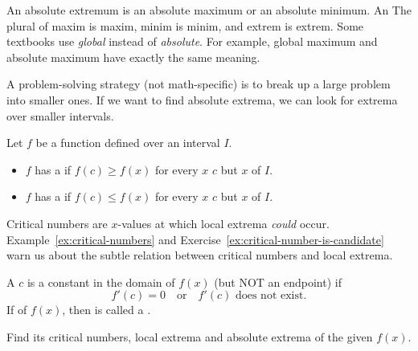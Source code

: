 \documentclass[../main.tex]{subfiles}
\begin{document}
An absolute extremum is an absolute maximum or an absolute minimum. An The plural of maxim is maxim, minim is minim, and extrem is extrem.  Some textbooks use \emph{global} instead of \emph{absolute}. For example, global maximum and absolute maximum have exactly the same meaning.

\clearpage


A problem-solving strategy (not math-specific) is to break up a large problem into smaller ones.  If we want to find absolute extrema, we can look for extrema over smaller intervals.

\begin{mdframed}[style=withref-compact]
  Let \(f\) be a function defined over an interval \(I\).

  \begin{itemize}[noitemsep]
    \item \(f\) has a  if \(f(c) \ge f(x)\) for every \(x\)  \(c\) but \(x\)  of \(I\).
    \item \(f\) has a  if \(f(c) \le f(x)\) for every \(x\)  \(c\) but \(x\)  of \(I\).
  \end{itemize}

\end{mdframed}

Critical numbers are \(x\)-values at which local extrema \emph{could} occur.   Example~\ref{ex:critical-numbers} and Exercise~\ref{ex:critical-number-is-candidate} warn us about the subtle relation between critical numbers and local extrema.
\begin{mdframed}[style=withref-compact]
  A  \(c\) is a constant in the domain of \(f(x)\) (but NOT an endpoint) if 
  \[
    f'(c) = 0 \quad\text{or}\quad f'(c) \text{ does not exist}.
  \]
  If  of \(f(x)\), then  is called a .

\end{mdframed}

\begin{example} \label{ex:critical-numbers}
  Find its critical numbers, local extrema and absolute extrema of the given \(f(x)\).

  \begin{center}
    
  \end{center}
\end{example}
\end{document}
